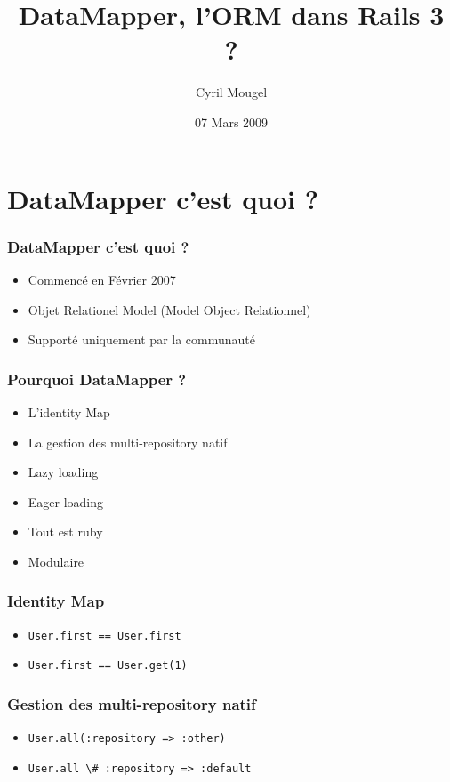 \documentclass{beamer}
\title{DataMapper, l'ORM dans Rails 3 ?}
\author{Cyril Mougel}
\date{07 Mars 2009}
\begin{document}
\begin{frame}
    \titlepage
\end{frame}

\section{DataMapper c'est quoi ?}

\begin{frame}
	\frametitle{DataMapper c'est quoi ?}
	\begin{itemize}
        \item Commencé en Février 2007
        \item Objet Relationel Model (Model Object Relationnel)
        \item Supporté uniquement par la communauté
	\end{itemize}
\end{frame}

\begin{frame}
    \frametitle{Pourquoi DataMapper ?}
    \begin{itemize}
        \item L'identity Map
        \item La gestion des multi-repository natif
        \item Lazy loading
        \item Eager loading
        \item Tout est ruby
        \item Modulaire
    \end{itemize}
\end{frame}

\begin{frame}
    \frametitle{Identity Map}
    \begin{itemize}
        \item \lstinline{User.first == User.first}
        \item \lstinline{User.first == User.get(1)}
    \end{itemize}
\end{frame}

\begin{frame}
    \frametitle{Gestion des multi-repository natif}
    \begin{itemize}
        \item \lstinline{User.all(:repository => :other)}
        \item \lstinline{User.all \# :repository => :default}
    \end{itemize}
\end{frame}
\end{document}

